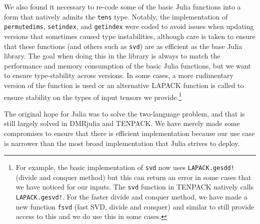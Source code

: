 \documentclass{juliacon}
\begin{document}
We also found it necessary to re-code some of the basic Julia functions into a form that natively admits the {\tt tens} type. Notably, the implementation of {\tt permutedims}, {\tt setindex}, and {\tt getindex} were coded to avoid issues when updating versions that sometimes caused type instabilities, although care is taken to ensure that these functions (and others such as {\tt svd}) are as efficient as the base Julia library. %
The goal when doing this in the library is always to match the performance and memory consumption of the basic Julia functions, but we want to ensure type-stability across versions. In some cases, a more rudimentary version of the function is used \cite{press1992numerical} or an alternative LAPACK function is called to ensure stability on the types of input tensors we provide.\footnote{For example, the basic implementation of {\tt svd} now uses {\tt LAPACK.gesdd!} (divide and conquer method) but this can return an error in some cases that we have noticed for our inputs. The {\tt svd} function in TENPACK natively calls {\tt LAPACK.gesvd!}. For the faster divide and conquer method, we have made a new function {\tt fsvd} (fast SVD, divide and conquer) and similar to still provide access to this and we do use this in some cases.}



The original hope for Julia was to solve the two-language problem, and that is still largely solved in DMRjulia and TENPACK. We have merely made some compromises to ensure that there is efficient implementation because our use case is narrower than the most broad implementation that Julia strives to deploy.

\end{document}
